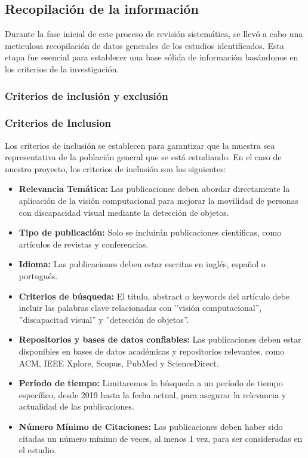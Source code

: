 \documentclass[letterpaper]{article}
\begin{document}
 \subsection{Recopilación de la información}
 Durante la fase inicial de este proceso de revisión sistemática, se llevó a cabo una meticulosa recopilación de datos generales de los estudios identificados. Esta etapa fue esencial para establecer una base sólida de información basándonos en los criterios de la investigación.

 \subsubsection{Criterios de inclusión y exclusión}
 \subsubsection{Criterios de Inclusion}
Los criterios de inclusión se establecen para garantizar que la muestra sea representativa de la población general que se está estudiando. En el caso de nuestro proyecto, los criterios de inclusión son los siguientes:

\begin{itemize}
    \item \textbf{Relevancia Temática: }Las publicaciones deben abordar directamente la aplicación de la visión computacional para mejorar la movilidad de personas con discapacidad visual mediante la detección de objetos.
    \item \textbf{Tipo de publicación: }Solo se incluirán publicaciones científicas, como artículos de revistas y conferencias.
    \item \textbf{Idioma: }Las publicaciones deben estar escritas en inglés, español o portugués.
    \item \textbf{Criterios de búsqueda: }El título, abstract o keywords del artículo debe incluir las palabras clave relacionadas con ''visión computacional'', ''discapacitad visual'' y ''detección de objetos''.
    \item \textbf{Repositorios y bases de datos confiables: }Las publicaciones deben estar disponibles en bases de datos académicas y repositorios relevantes, como ACM, IEEE Xplore, Scopus, PubMed y ScienceDirect.
    \item \textbf{Período de tiempo: }Limitaremos la búsqueda a un período de tiempo específico, desde 2019 hasta la fecha actual, para asegurar la relevancia y actualidad de las publicaciones.
    \item \textbf{Número Mínimo de Citaciones: }Las publicaciones deben haber sido citadas un número mínimo de veces, al menos 1 vez, para ser consideradas en el estudio. 
\end{itemize}
\end{document}
